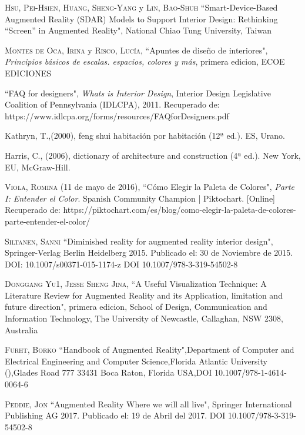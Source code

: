 \begin{thebibliography}{X}
	
	 \textsc{Hsu, Pei-Hsien}, \textsc{Huang, Sheng-Yang} y \textsc{Lin, Bao-Shuh} ``Smart-Device-Based Augmented Reality (SDAR) Models to Support Interior Design: Rethinking ``Screen” in Augmented Reality", National Chiao Tung University, Taiwan
	
	 \textsc{Montes de Oca, Irina} y \textsc{Risco, Lucía},
	``Apuntes de diseño de interiores",
	\textit{Principios básicos de escalas. espacios, colores y más}, primera edicion,
	ECOE EDICIONES
	
	 ``FAQ for designers", \textit{Whats is Interior Design}, Interior Design Legislative Coalition of Pennsylvania (IDLCPA), 2011. Recuperado de: https://www.idlcpa.org/forms/resources/FAQforDesigners.pdf
	
	 Kathryn, T.,(2000), feng shui habitación por habitación (12ª ed.). ES, Urano.	
	
	 Harris, C., (2006), dictionary of architecture and construction (4ª ed.). New York, EU, McGraw-Hill.
	
		
	 \textsc{Viola, Romina} (11 de mayo de 2016), ``Cómo Elegir la Paleta de Colores", \textit{Parte I: Entender el Color}. Spanish Community Champion | Piktochart. [Online] Recuperado de: https://piktochart.com/es/blog/como-elegir-la-paleta-de-colores-parte-entender-el-color/
	
	
	
	 \textsc{Siltanen, Sanni} ``Diminished reality for augmented reality interior design", Springer-Verlag Berlin Heidelberg 2015. Publicado el: 30 de Noviembre de 2015. DOI: 10.1007/s00371-015-1174-z
	DOI 10.1007/978-3-319-54502-8
	
	 \textsc{Donggang Yu1, Jesse Sheng Jina},
	``A Useful Visualization Technique: A Literature Review for Augmented Reality and its Application, limitation and future direction", primera edicion,
	School of Design, Communication and Information Technology, The University of Newcastle, Callaghan, NSW 2308, Australia
	
	
	
	 \textsc{Furht, Borko} ``Handbook of Augmented Reality",Department of Computer and Electrical Engineering and Computer Science,Florida Atlantic University (),Glades Road 777 33431 Boca Raton, Florida USA,DOI 10.1007/978-1-4614-0064-6
	
	 \textsc{Peddie, Jon} ``Augmented Reality Where we will all live", Springer International Publishing AG 2017. Publicado el: 19 de Abril del 2017. DOI 10.1007/978-3-319-54502-8 
	

\end{thebibliography}
